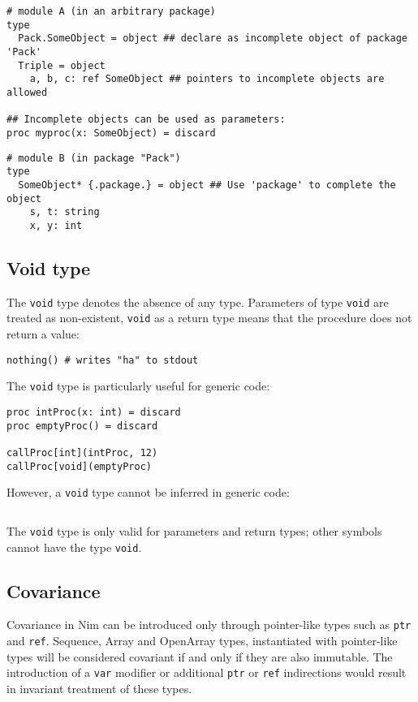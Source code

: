 \begin{verbatim}
# module A (in an arbitrary package)
type
  Pack.SomeObject = object ## declare as incomplete object of package 'Pack'
  Triple = object
    a, b, c: ref SomeObject ## pointers to incomplete objects are allowed

## Incomplete objects can be used as parameters:
proc myproc(x: SomeObject) = discard
\end{verbatim}

\begin{verbatim}
# module B (in package "Pack")
type
  SomeObject* {.package.} = object ## Use 'package' to complete the object
    s, t: string
    x, y: int
\end{verbatim}

\hypertarget{void-type}{%
\subsection{Void type}\label{void-type}}

The \texttt{void} type denotes the absence of any type. Parameters of
type \texttt{void} are treated as non-existent, \texttt{void} as a
return type means that the procedure does not return a value:

\begin{verbatim}
nothing() # writes "ha" to stdout
\end{verbatim}

The \texttt{void} type is particularly useful for generic code:

\begin{verbatim}
proc intProc(x: int) = discard
proc emptyProc() = discard

callProc[int](intProc, 12)
callProc[void](emptyProc)
\end{verbatim}

However, a \texttt{void} type cannot be inferred in generic code:

\begin{verbatim}
\end{verbatim}

The \texttt{void} type is only valid for parameters and return types;
other symbols cannot have the type \texttt{void}.

\hypertarget{covariance}{%
\subsection{Covariance}\label{covariance}}

Covariance in Nim can be introduced only through pointer-like types such
as \texttt{ptr} and \texttt{ref}. Sequence, Array and OpenArray types,
instantiated with pointer-like types will be considered covariant if and
only if they are also immutable. The introduction of a \texttt{var}
modifier or additional \texttt{ptr} or \texttt{ref} indirections would
result in invariant treatment of these types.

